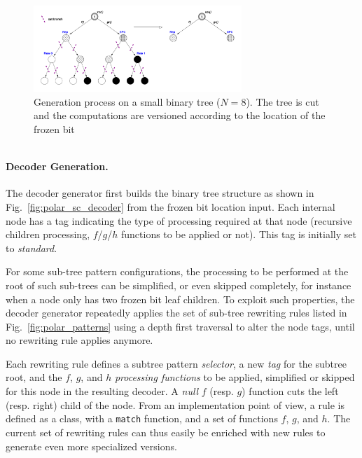 \begin{figure}
  \centering
  \includegraphics[width=0.70\textwidth]{polar/patterns_example}
  \caption{Generation process on a small binary tree ($N = 8$). The tree is cut
    and the computations are versioned according to the location of the frozen
    bit}
  \label{fig:polar_patterns_example}
\end{figure}

\begin{listing}
  \inputminted[frame=lines,linenos]{C++}{main/chapter2/src/polar/generated_sc_decoder.cpp}
  \caption{The final code generated corresponding to the pruned tree in
    Fig.~\ref{fig:polar_patterns_example}.}
  \label{lst:polar_patterns_example}
\end{listing}

\paragraph{Decoder Generation.}

The decoder generator first builds the binary tree structure as shown in
Fig.~\ref{fig:polar_sc_decoder} from the frozen bit location input. Each
internal node has a tag indicating the type of processing required at that node
(recursive children processing, $f$/$g$/$h$ functions to be applied or not).
This tag is initially set to \emph{standard}.

For some sub-tree pattern configurations, the processing to be performed at the
root of such sub-trees can be simplified, or even skipped completely, for
instance when a node only has two frozen bit leaf children. To exploit such
properties, the decoder generator repeatedly applies the set of sub-tree
rewriting rules listed in Fig.~\ref{fig:polar_patterns} using a depth first
traversal to alter the node tags, until no rewriting rule applies anymore.

Each rewriting rule defines a subtree pattern \emph{selector}, a new \emph{tag}
for the subtree root, and the $f$, $g$, and $h$ \emph{processing functions} to
be applied, simplified or skipped for this node in the resulting decoder. A
\emph{null} $f$ (resp. $g$) function cuts the left (resp. right) child of the
node. From an implementation point of view, a rule is defined as a class, with a
\texttt{match} function, and a set of functions $f$, $g$, and $h$. The current
set of rewriting rules can thus easily be enriched with new rules to generate
even more specialized versions.

